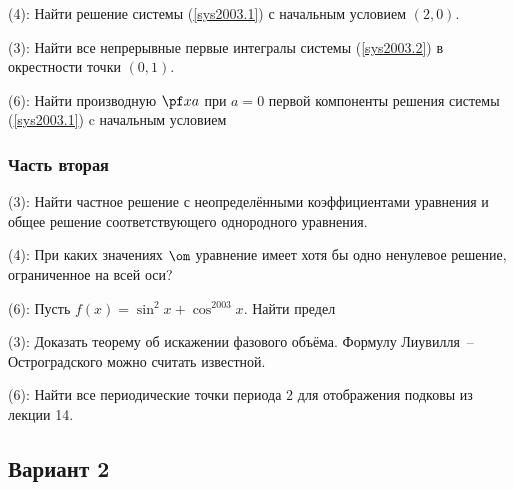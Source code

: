 \documentclass[a4paper]{article}
\newcommand{\skill}[1]{\textsf{(#1):}}
\begin{document}
\begin{problem}
\skill{4}
Найти решение системы (\ref{sys2003.1}) с начальным условием $(2,0)$.
\end{problem}

\begin{problem}

 \skill{3} Найти все непрерывные первые интегралы системы (\ref{sys2003.2}) в окрестности
точки $(0,1)$.

 \skill{6} Найти производную $\pf xa$ при $a=0$ первой компоненты решения системы
(\ref{sys2003.1}) c начальным условием 
\end{problem}

\subsubsection{Часть вторая}

\begin{problem}
\skill{3} Найти частное решение с неопределёнными коэффициентами уравнения
и общее решение соответствующего однородного уравнения.
\end{problem}

\begin{problem}
\skill{4}
При каких значениях $\om$ уравнение
имеет хотя бы одно ненулевое решение, ограниченное на всей оси?
\end{problem}

\begin{problem}
\skill{6} Пусть $f(x) = \sin^2 x+ \cos^{2003} x$. Найти предел
\end{problem}

\begin{problem}
\skill{3}
Доказать теорему об искажении фазового объёма. Формулу Лиувилля~-- Остроградского можно считать известной.
\end{problem}

\begin{problem}
\skill{6}
Найти все периодические точки периода $2$ для отображения подковы из лекции 14.
\end{problem}

\subsection{Вариант 2}
\end{document}
